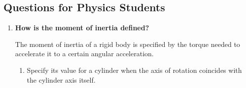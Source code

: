 \subsection{Questions for Physics Students}
\begin{enumerate}
	\item \textbf{How is the moment of inertia defined?}
	
	The moment of inertia of a rigid body is specified by the torque needed to accelerate it to a certain angular acceleration.
	\begin{enumerate}
		\item 
		
		Specify its value for a cylinder when the axis of rotation coincides with the cylinder axis itself.
	\end{enumerate}
\end{enumerate}